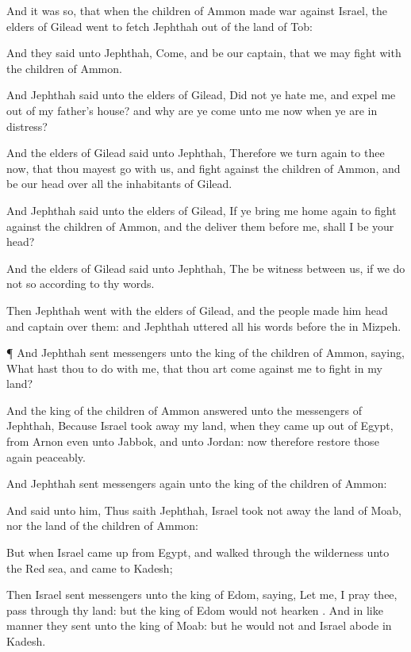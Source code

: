{And it was so, that when the
children of
Ammon made
war against
Israel, the
elders of
Gilead
went to
fetch
Jephthah out of the
land of
Tob:

And they
said unto
Jephthah,
Come, and be our
captain, that we may
fight with the
children of
Ammon.

And
Jephthah
said unto the
elders of
Gilead, Did not ye
hate me, and
expel me out of my
father’s
house? and why are ye
come unto me now when ye are in
distress?

And the
elders of
Gilead
said unto
Jephthah, Therefore we turn
again to thee now, that thou mayest
go with us, and
fight against the
children of
Ammon, and be our
head over all the
inhabitants of
Gilead.

And
Jephthah
said unto the
elders of
Gilead, If ye bring me home
again to
fight against the
children of
Ammon, and the
{}
deliver them
before me, shall I be your
head?

And the
elders of
Gilead
said unto
Jephthah, The
{} be
witness between us, if we
do not so according to thy
words.

Then
Jephthah
went with the
elders of
Gilead, and the
people
made him
head and
captain over them: and
Jephthah
uttered all his
words
before the
{} in
Mizpeh.


\par }{\PP {}¶ And
Jephthah
sent
messengers unto the
king of the
children of
Ammon,
saying, What hast thou to do with me, that thou art
come against me to
fight in my
land?

And the
king of the
children of
Ammon
answered unto the
messengers of
Jephthah, Because
Israel took
away my
land, when they came
up out of
Egypt, from
Arnon even unto
Jabbok, and unto
Jordan: now therefore restore those
{}
again
peaceably.

And
Jephthah
sent
messengers
again unto the
king of the
children of
Ammon:

And
said unto him, Thus
saith
Jephthah,
Israel took not
away the
land of
Moab, nor the
land of the
children of
Ammon:

But when
Israel came
up from
Egypt, and
walked through the
wilderness unto the
Red
sea, and
came to
Kadesh;

Then
Israel
sent
messengers unto the
king of
Edom,
saying, Let me, I pray thee, pass
through thy
land: but the
king of
Edom would not
hearken
{}. And in like manner they
sent unto the
king of
Moab: but he
would not
{} and
Israel
abode in
Kadesh.

}
